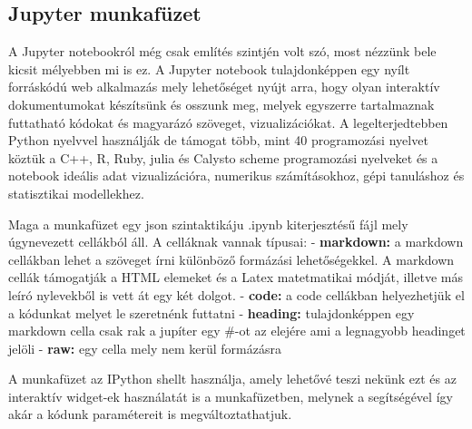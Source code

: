     \subsection{Jupyter munkafüzet}\label{jupyter-munkafuxfczet}

    A Jupyter notebookról még csak említés szintjén volt szó, most nézzünk
bele kicsit mélyebben mi is ez. A Jupyter notebook tulajdonképpen egy
nyílt forráskódú web alkalmazás mely lehetőséget nyújt arra, hogy olyan
interaktív dokumentumokat készítsünk és osszunk meg, melyek egyszerre
tartalmaznak futtatható kódokat és magyarázó szöveget, vizualizációkat.
A legelterjedtebben Python nyelvvel használják de támogat több, mint 40
programozási nyelvet köztük a C++, R, Ruby, julia és Calysto scheme
programozási nyelveket és a notebook ideális adat vizualizációra,
numerikus számításokhoz, gépi tanuláshoz és statisztikai modellekhez.

Maga a munkafüzet egy json szintaktikáju .ipynb kiterjesztésű fájl mely
úgynevezett cellákból áll. A celláknak vannak típusai: -
\textbf{markdown:} a markdown cellákban lehet a szöveget írni különböző
formázási lehetőségekkel. A markdown cellák támogatják a HTML elemeket
és a Latex matetmatikai módját, illetve más leíró nylevekből is vett át
egy két dolgot. - \textbf{code:} a code cellákban helyezhetjük el a
kódunkat melyet le szeretnénk futtatni - \textbf{heading:}
tulajdonképpen egy markdown cella csak rak a jupíter egy \#-ot az
elejére ami a legnagyobb headinget jelöli - \textbf{raw:} egy cella mely
nem kerül formázásra

A munkafüzet az IPython shellt használja, amely lehetővé teszi nekünk
ezt és az interaktív widget-ek használatát is a munkafüzetben, melynek a
segítségével így akár a kódunk paramétereit is megváltoztathatjuk.

